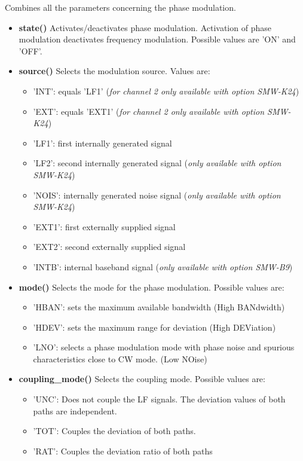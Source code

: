 \documentclass[11pt]{article} %
\begin{document}
Combines all the parameters concerning the phase modulation.
\begin{itemize}
\item {\bf state()} Activates/deactivates phase modulation. Activation of phase modulation deactivates frequency modulation. Possible values are 'ON' and 'OFF'.
\item {\bf source()} Selects the modulation source. Values are:
	\begin{itemize}[]
	\item 'INT': equals 'LF1' ({\it for channel 2 only available with option SMW-K24})
	\item 'EXT': equals 'EXT1' ({\it for channel 2 only available with option SMW-K24})
	\item 'LF1': first internally generated signal
	\item 'LF2': second internally generated signal ({\it only available with option SMW-K24})
	\item 'NOIS': internally generated noise signal ({\it only available with option SMW-K24})
	\item 'EXT1': first externally supplied signal
	\item 'EXT2': second externally supplied signal
	\item 'INTB': internal baseband signal ({\it only available with option SMW-B9})
	\end{itemize}
\item {\bf mode()} Selects the mode for the phase modulation. Possible values are:
	\begin{itemize}[]
	\item 'HBAN': sets the maximum available bandwidth (High BANdwidth)
	\item 'HDEV': sets the maximum range for deviation (High DEViation)
	\item 'LNO': selects a phase modulation mode with phase noise and spurious characteristics close to CW mode. (Low NOise)
	\end{itemize}
\item {\bf coupling\_mode()} Selects the coupling mode. Possible values are:
	\begin{itemize}[]
	\item 'UNC': Does not couple the LF signals. The deviation values of both paths are independent.
	\item 'TOT': Couples the deviation of both paths.
	\item 'RAT': Couples the deviation ratio of both paths
	\end{itemize}

\end{itemize}
\end{document}
